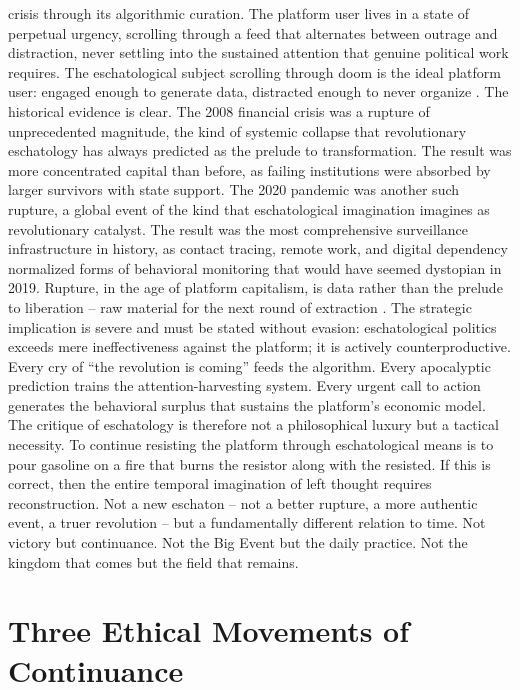 crisis through its algorithmic curation. The platform user lives in a state of perpetual urgency, scrolling through a feed that alternates between outrage and distraction, never settling into the sustained attention that genuine political work requires. The eschatological subject scrolling through doom is the ideal platform user: engaged enough to generate data, distracted enough to never organize \cite{harvey_2005}. The historical evidence is clear. The 2008 financial crisis was a rupture of unprecedented magnitude, the kind of systemic collapse that revolutionary eschatology has always predicted as the prelude to transformation. The result was more concentrated capital than before, as failing institutions were absorbed by larger survivors with state support. The 2020 pandemic was another such rupture, a global event of the kind that eschatological imagination imagines as revolutionary catalyst. The result was the most comprehensive surveillance infrastructure in history, as contact tracing, remote work, and digital dependency normalized forms of behavioral monitoring that would have seemed dystopian in 2019. Rupture, in the age of platform capitalism, is data rather than the prelude to liberation – raw material for the next round of extraction \cite{srnicek_2017}. The strategic implication is severe and must be stated without evasion: eschatological politics exceeds mere ineffectiveness against the platform; it is actively counterproductive. Every cry of “the revolution is coming” feeds the algorithm. Every apocalyptic prediction trains the attention-harvesting system. Every urgent call to action generates the behavioral surplus that sustains the platform’s economic model. The critique of eschatology is therefore not a philosophical luxury but a tactical necessity. To continue resisting the platform through eschatological means is to pour gasoline on a fire that burns the resistor along with the resisted. If this is correct, then the entire temporal imagination of left thought requires reconstruction. Not a new eschaton – not a better rupture, a more authentic event, a truer revolution – but a fundamentally different relation to time. Not victory but continuance. Not the Big Event but the daily practice. Not the kingdom that comes but the field that remains.

\section{Three Ethical Movements of Continuance}

